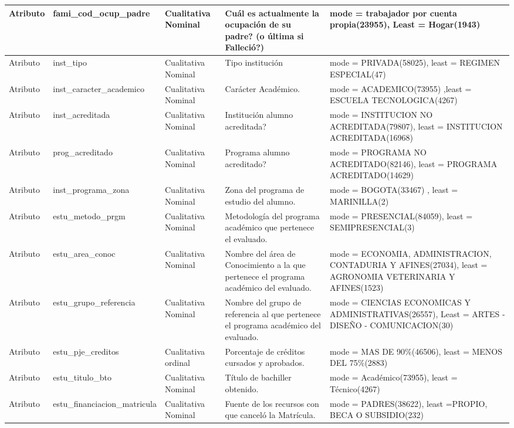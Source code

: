\begin{table}[H]
\begin{flushleft}
\begin{tabular}{|>{\centering\arraybackslash}m{2cm}|>{\arraybackslash}m{4cm}|>{\arraybackslash}m{2cm}|>{\arraybackslash}m{3cm}|>{\arraybackslash}m{4cm}| }
Atributo & fami\_cod\_ocup\_padre & Cualitativa Nominal & Cuál es actualmente la ocupación de su padre? (o última si Falleció?) & mode = trabajador por cuenta propia(23955), Least = Hogar(1943) \\ \hline
Atributo & inst\_tipo & Cualitativa Nominal & Tipo institución & mode = PRIVADA(58025), least = REGIMEN ESPECIAL(47) \\ \hline
Atributo & inst\_caracter\_academico & Cualitativa Nominal & Carácter Académico. & mode = ACADEMICO(73955) ,least = ESCUELA TECNOLOGICA(4267) \\ \hline
Atributo & inst\_acreditada & Cualitativa Nominal & Institución alumno acreditada? & mode = INSTITUCION NO ACREDITADA(79807), least = INSTITUCION ACREDITADA(16968) \\ \hline
Atributo & prog\_acreditado & Cualitativa Nominal & Programa alumno acreditado? & mode = PROGRAMA NO ACREDITADO(82146), least = PROGRAMA ACREDITADO(14629) \\ \hline
Atributo & inst\_programa\_zona & Cualitativa Nominal & Zona del programa de estudio del alumno. & mode = BOGOTA(33467) , least = MARINILLA(2) \\ \hline
Atributo & estu\_metodo\_prgm & Cualitativa Nominal & Metodología del programa académico que pertenece el evaluado. & mode = PRESENCIAL(84059), least = SEMIPRESENCIAL(3) \\ \hline
Atributo & estu\_area\_conoc & Cualitativa Nominal & Nombre del área de Conocimiento a la que pertenece el programa
académico del evaluado. & mode = ECONOMIA, ADMINISTRACION, CONTADURIA Y AFINES(27034),
least = AGRONOMIA VETERINARIA Y AFINES(1523) \\ \hline
Atributo & estu\_grupo\_referencia & Cualitativa Nominal & Nombre del grupo de referencia al que pertenece el programa
académico del evaluado. & mode = CIENCIAS ECONOMICAS Y ADMINISTRATIVAS(26557),
Least = ARTES - DISEÑO - COMUNICACION(30) \\ \hline
Atributo & estu\_pje\_creditos & Cualitativa ordinal & Porcentaje de créditos cursados y aprobados. & mode = MAS DE 90\%(46506), least = MENOS DEL 75\%(2883)  \\ \hline
Atributo & estu\_titulo\_bto & Cualitativa Nominal & Título de bachiller obtenido. & mode = Académico(73955), least = Técnico(4267) \\ \hline
Atributo & estu\_financiacion\_matricula & Cualitativa Nominal & Fuente de los recursos con que canceló la Matrícula. & mode = PADRES(38622), least =PROPIO, BECA O SUBSIDIO(232) \\ \hline

\end{tabular}
\end{flushleft}
\end{table}
